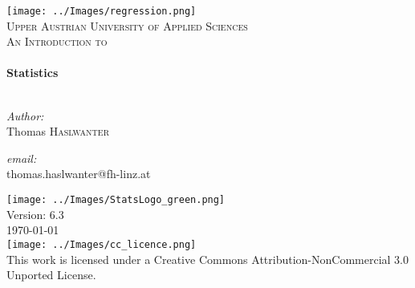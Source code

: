 \begin{titlepage}

\begin{center}


\texttt{[image: ../Images/regression.png]}\\[1cm]

\textsc{\LARGE Upper Austrian University of Applied Sciences }\\[1.5cm]

\textsc{\Large An Introduction to}\\[0.5cm]


\HRule \\[0.4cm]
{ \huge \bfseries Statistics}\\[0.4cm]

\HRule \\[1.5cm]

\begin{minipage}{0.4\textwidth}
\begin{flushleft} \large
\emph{Author:}\\
Thomas \textsc{Haslwanter}
\end{flushleft}
\end{minipage}
\begin{minipage}{0.4\textwidth}
\begin{flushright} \large
\emph{email:} \\
{\small thomas.haslwanter@fh-linz.at}
\end{flushright}
\end{minipage}

\vfill

\texttt{[image: ../Images/StatsLogo\_green.png]}\\
Version: 6.3 \\
{\large \today} \\[1cm]
\texttt{[image: ../Images/cc\_licence.png]}\\
\footnotesize{This work is licensed under a Creative Commons Attribution-NonCommercial 3.0 Unported License.}


\end{center}

\end{titlepage}
